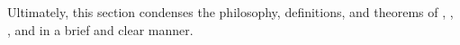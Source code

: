\documentclass[12pt]{ucthesis}
\begin{document}
Ultimately, this section condenses the philosophy, definitions, and theorems of \citet[Chp. 3]{Slotine1991}, \citet[Chp. 3]{Khalil1996}, \citet[Chp. 3]{Harkegard2003}, \citet[Chp. 2]{Krstic95} and \citet[Appendix A]{Farrell2006} in a brief and clear manner.

%
%
%
%
%
%
%
%
%
\end{document}
